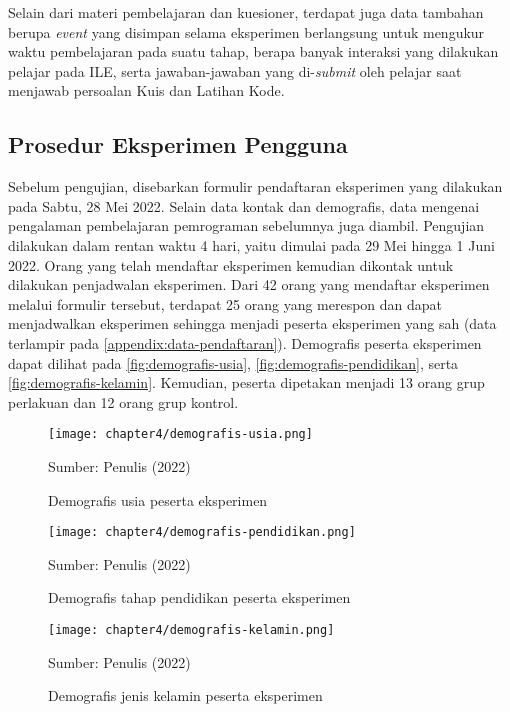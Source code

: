 Selain dari materi pembelajaran dan kuesioner, terdapat juga data tambahan berupa \textit{event} yang disimpan selama eksperimen berlangsung untuk mengukur waktu pembelajaran pada suatu tahap, berapa banyak interaksi yang dilakukan pelajar pada ILE, serta jawaban-jawaban yang di-\textit{submit} oleh pelajar saat menjawab persoalan Kuis dan Latihan Kode.

\subsection{Prosedur Eksperimen Pengguna}
Sebelum pengujian, disebarkan formulir pendaftaran eksperimen yang dilakukan pada Sabtu, 28 Mei 2022. Selain data kontak dan demografis, data mengenai pengalaman pembelajaran pemrograman sebelumnya juga diambil. Pengujian dilakukan dalam rentan waktu 4 hari, yaitu dimulai pada 29 Mei hingga 1 Juni 2022. Orang yang telah mendaftar eksperimen kemudian dikontak untuk dilakukan penjadwalan eksperimen. Dari 42 orang yang mendaftar eksperimen melalui formulir tersebut, terdapat 25 orang yang merespon dan dapat menjadwalkan eksperimen sehingga menjadi peserta eksperimen yang sah (data terlampir pada \autoref{appendix:data-pendaftaran}). Demografis peserta eksperimen dapat dilihat pada \autoref{fig:demografis-usia}, \autoref{fig:demografis-pendidikan}, serta \autoref{fig:demografis-kelamin}. Kemudian, peserta dipetakan menjadi 13 orang grup perlakuan dan 12 orang grup kontrol.

\begin{figure}[H]
  \centering
  \texttt{[image: chapter4/demografis-usia.png]}
  \caption{Demografis usia peserta eksperimen} \label{fig:demografis-usia}
  Sumber: Penulis (2022)
\end{figure}
\begin{figure}[H]
  \centering
  \texttt{[image: chapter4/demografis-pendidikan.png]}
  \caption{Demografis tahap pendidikan peserta eksperimen} \label{fig:demografis-pendidikan}
  Sumber: Penulis (2022)
\end{figure}
\begin{figure}[H]
  \centering
  \texttt{[image: chapter4/demografis-kelamin.png]}
  \caption{Demografis jenis kelamin peserta eksperimen} \label{fig:demografis-kelamin}
  Sumber: Penulis (2022)
\end{figure}

